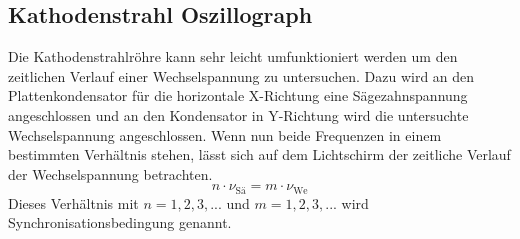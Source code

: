 \subsection{Kathodenstrahl Oszillograph}
Die Kathodenstrahlröhre kann sehr leicht umfunktioniert werden um den zeitlichen Verlauf einer Wechselspannung zu untersuchen.
Dazu wird an den Plattenkondensator für die horizontale X-Richtung eine Sägezahnspannung angeschlossen und an den Kondensator in Y-Richtung wird die untersuchte Wechselspannung angeschlossen.
Wenn nun beide Frequenzen in einem bestimmten Verhältnis stehen, lässt sich auf dem Lichtschirm der zeitliche Verlauf der Wechselspannung betrachten.
\begin{equation}
    n\cdot \nu_{\text{Sä}} = m\cdot \nu_{\text{We}}
\end{equation}
Dieses Verhältnis mit $n = 1,2,3,...$ und $m = 1,2,3,...$ wird Synchronisationsbedingung genannt.